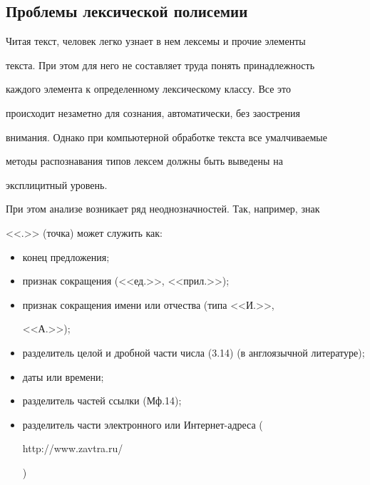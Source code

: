    \vspace*{-4pt}


   


\subsection{Проблемы лексической полисемии}





\vspace*{-2pt}





   Читая текст, человек легко узнает в нем  лексемы и прочие элементы 


текста. При этом для него не составляет труда понять принадлежность 


каждого элемента к определенному лексическому классу. Все это 


происходит незаметно для сознания, автоматически, без заострения 


внимания. Однако при компьютерной обработке текста все умалчиваемые 


методы распознавания типов лексем должны быть выведены на 


эксплицитный уровень.


   


   При этом анализе возникает ряд неоднозначностей. Так, например, знак 


<<.>> (точка) может служить как: 


   \begin{itemize}


   \item конец предложения; 


   \item признак сокращения (<<ед.>>, <<прил.>>); 


   \item признак сокращения имени или отчества (типа <<И.>>, 


<<А.>>); 


   \item разделитель целой и дробной части числа (3.14) (в англоязычной литературе);


   \item даты или времени;


   \item разделитель частей ссылки (Мф.14);


   \item разделитель части электронного или Интернет-адреса ({\sf 


http://www.\linebreak zavtra.ru/}) 


   \end{itemize}


